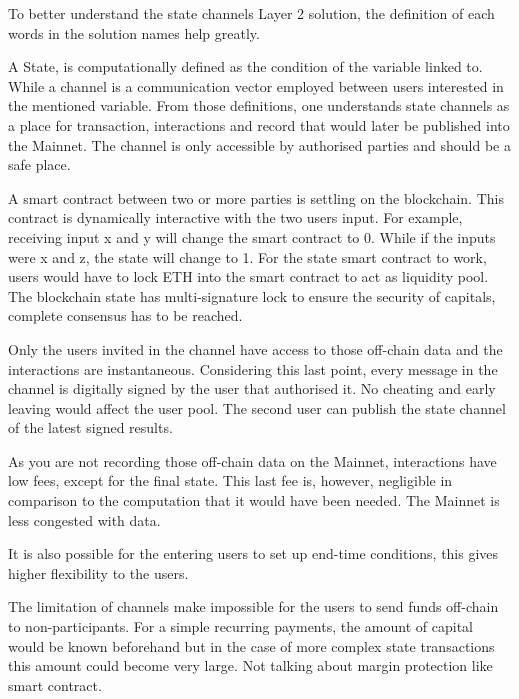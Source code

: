 
To better understand the state channels Layer 2 solution, the definition of each words in the solution names help greatly.

A State, is computationally defined as the condition of the variable linked to. While a channel is a communication vector employed between users interested in the mentioned variable. From those definitions, one understands state channels as a place for transaction, interactions and record that would later be published into the Mainnet. The channel is only accessible by authorised parties and should be a safe place.


A smart contract between two or more parties is settling on the blockchain. This contract is dynamically interactive with the two users input. For example, receiving input x and y will change the smart contract to 0. While if the inputs were x and z, the state will change to 1. For the state smart contract to work, users would have to lock ETH into the smart contract to act as liquidity pool. The blockchain state has multi-signature lock to ensure the security of capitals, complete consensus has to be reached.


Only the users invited in the channel have access to those off-chain data and the interactions are instantaneous. Considering this last point, every message in the channel is digitally signed by the user that authorised it. No cheating and early leaving would affect the user pool. The second user can publish the state channel of the latest signed results.

As you are not recording those off-chain data on the Mainnet, interactions have low fees, except for the final state. This last fee is, however, negligible in comparison to the computation that it would have been needed. The Mainnet is less congested with data.

It is also possible for the entering users to set up end-time conditions, this gives higher flexibility to the users.


The limitation of channels make impossible for the users to send funds off-chain to non-participants. For a simple recurring payments, the amount of capital would be known beforehand but in the case of more complex state transactions this amount could become very large. Not talking about margin protection like smart contract.

